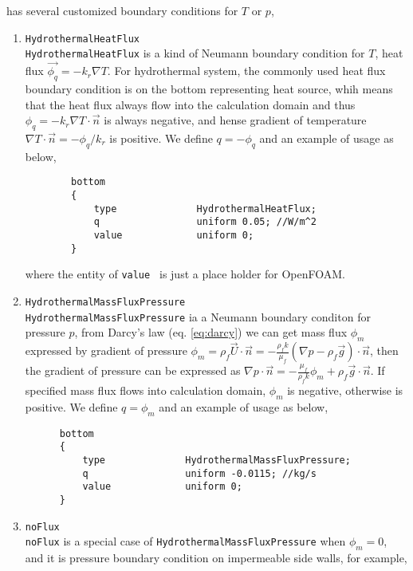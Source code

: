 \foam has several customized boundary conditions for $T$ or $p$,
\begin{enumerate}
	\item \texttt{HydrothermalHeatFlux} \\
	\texttt{HydrothermalHeatFlux} is a kind of Neumann boundary condition for $T$, heat flux $\vec{\phi_q}=-k_r \nabla T$. For hydrothermal system, the commonly used heat flux boundary condition is on the bottom representing heat source, whih means that the heat flux always flow into the calculation domain and thus $\phi_q = -k_r \nabla T\cdot \vec{n}$ is always negative, and hense gradient of temperature $\nabla T \cdot \vec{n} =- \phi_q /k_r$ is positive. We define $q=-\phi_q$ and an example of usage as below,
	
	\begin{verbatim}
		bottom
		{
			type              HydrothermalHeatFlux;
			q                 uniform 0.05; //W/m^2
			value             uniform 0;
		}
	\end{verbatim}
	where the entity of \texttt{value } is just a place holder for OpenFOAM.
	
	\item \texttt{HydrothermalMassFluxPressure} \\
	\texttt{HydrothermalMassFluxPressure} ia a Neumann boundary conditon for pressure $p$, 
	from Darcy's law (eq. \ref{eq:darcy}) we can get mass flux $\phi_m$ expressed by  gradient of pressure
	$\phi_m = \rho_f \vec{U} \cdot \vec{n} = - \frac{\rho_f k}{\mu_f} (\nabla p-\rho_f \vec{g}) \cdot \vec{n}$, 
	then the gradient of pressure can be expressed as
	 $\nabla p \cdot \vec{n}=-\frac{\mu_f}{\rho_f k} \phi_m +\rho_f \vec{g} \cdot \vec{n}$.
	 If specified mass flux flows into calculation domain, $\phi_m$ is negative, otherwise is positive.
	 We define $q=\phi_m$ and an example of usage as below,
	 
	  \begin{verbatim}
	  bottom
	  {
		  type              HydrothermalMassFluxPressure;
		  q                 uniform -0.0115; //kg/s
		  value             uniform 0;
	  }
	  \end{verbatim}
	
	\item \texttt{noFlux} \\
	\texttt{noFlux} is a special case of \texttt{HydrothermalMassFluxPressure} when $\phi_m =0$, and it is pressure boundary condition on impermeable side walls, for example,
	

\end{enumerate}
